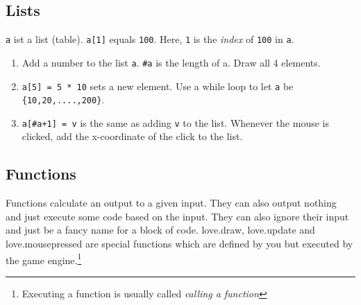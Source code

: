 \documentclass[a4paper, 11pt]{article}
\begin{document}
\subsection{Lists}

\texttt{a} ist a list (table). \texttt{a[1]} equals \texttt{100}. Here, \texttt{1} is the \textit{index} of \texttt{100} in \texttt{a}.
\newline

\begin{enumerate}
\item Add a number to the list \texttt{a}. \texttt{\#a} is the length of a. Draw all 4 elements.
\item \texttt{a[5] = 5 * 10} sets a new element. Use a while loop to let \texttt{a} be \texttt{\{10,20,....,200\}}.
\item \texttt{a[\#a+1] = v} is the same as adding \texttt{v} to the list. Whenever the mouse is clicked, add the x-coordinate of the click to the list.
\end{enumerate}

\iffalse
\subsection{Functions}
Functions calculate an output to a given input. They can also output nothing and just execute some code based on the input. They can also ignore their input and just be a fancy name for a block of code.
love.draw, love.update and love.mousepressed are special functions which are defined by you but executed by the game engine.\footnote{Executing a function is usually called \textit{calling a function}}


\end{document}
